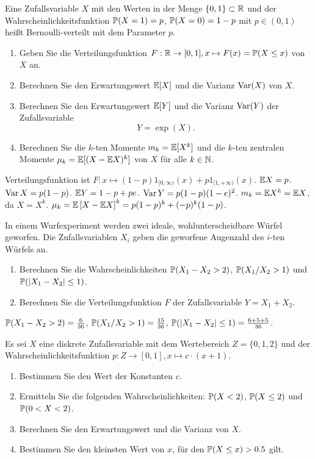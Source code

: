  Eine Zufallsvariable $X$ mit den
Werten in der Menge $\left\{ 0,1 \right\} \subset \mathbb R$ und der
Wahrscheinlichkeitsfunktion $\mathbb P(X=1)= p$, $\mathbb P(X=0)=1-p$ mit $p\in(0,1)$ heißt
Bernoulli-verteilt mit dem Parameter $p$. 
\begin{enumerate}
    \item Geben Sie die Verteilungsfunktion $F: \mathbb R\to [0,1], x\mapsto F(x) =
        \mathbb P(X\leq x)$ von $X$ an.

    \item Berechnen Sie den Erwartungswert $\mathbb E [X]$ und die Varianz $\operatorname{Var}(X)$ von $X$. 

    \item Berechnen Sie den Erwartungswert $\mathbb E [Y]$ und die Varianz $\operatorname{Var} (Y)$ der
        Zufallsvariable \[Y = \exp\left( X \right).\]

    \item Berechnen Sie die $k$-ten Momente $m_k=\mathbb E [X^k]$ und die $k$-ten
        zentralen Momente $\mu_k=\mathbb E[ (X-\mathbb E X)^k]$ von $X$ für alle $k\in
        \mathbb N$. 
\end{enumerate}

\solution Verteilungsfunktion ist $F: x\mapsto (1-p)1_{[0,\infty)}(x) + p 1_{[1,
+\infty)}(x)$. $\mathbb E X = p$. $\operatorname{Var} X = p(1-p)$. $\mathbb E Y = 1-p + p e$. $\operatorname{Var} Y =
p(1-p)(1-e)^2$. $m_k = \mathbb E X^{k} = \mathbb E X$, da $X = X^k$. $\mu_k = \mathbb E \left[ X
-\mathbb E X \right]^{k} = p(1-p)^{k} + (-p)^{k}(1-p)$.


 In einem Wurfexperiment
werden zwei ideale, wohlunterscheidbare Würfel geworfen. Die Zufallsvariablen
$X_i$ geben die geworfene Augenzahl des $i$-ten Würfels an.
\begin{enumerate}
    \item Berechnen Sie die Wahrscheinlichkeiten $\mathbb P(X_1-X_2 > 2)$, $\mathbb P(X_1/X_2 > 1)$
        und \linebreak $\mathbb P(|X_1-X_2| \leq 1)$. 
    \item Berechnen Sie die Verteilungsfunktion $F$ der Zufallsvariable $Y = X_1 + X_2$. 
\end{enumerate}

\solution $\mathbb P(X_1-X_2 > 2)=\frac{6}{36}$, $\mathbb P(X_1/X_2>1)=\frac{15}{36}$, 
$\mathbb P(|X_1-X_2| \leq 1) =\frac{6+5+5}{36}$. 


Es sei $X$ eine diskrete Zufallsvariable mit dem Wertebereich $Z=\{0,1,2\}$ und
der Wahrscheinlichkeitsfunktion $p: Z \to [0,1], x \mapsto c \cdot (x+1)$.
\begin{enumerate}
    \item Bestimmen Sie den Wert der Konstanten $c$.
    \item Ermitteln Sie die folgenden Wahrscheinlichkeiten: $\mathbb P(X<2)$, $\mathbb P(X
        \leq 2)$ und $\mathbb P(0<X<2)$. 
    \item Berechnen Sie den Erwartungswert und die Varianz von $X$.
    \item Bestimmen Sie den kleinsten Wert von $x$, für den $\mathbb P(X\leq x)>0.5$
        gilt.
\end{enumerate}


